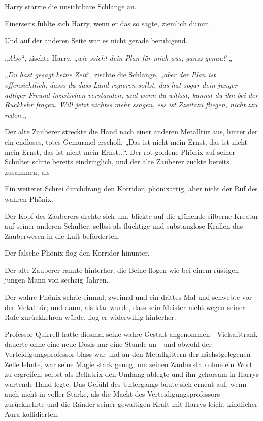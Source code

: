 {Harry starrte die unsichtbare Schlange an.

Einerseits fühlte sich Harry, wenn er das so sagte, ziemlich dumm.

Und auf der anderen Seite war es nicht gerade beruhigend.

„\emph{Also}“, zischte Harry, „\emph{wie} \emph{ssieht} \emph{dein Plan für mich aus,} \emph{ganzz} \emph{genau?} „

„\emph{Du hast gesagt keine Zeit}“, zischte die Schlange, „\emph{aber der Plan ist offensichtlich,} \emph{dasss} \emph{du} \emph{dass} \emph{Land regieren sollst, das hat sogar dein junger adliger Freund inzwischen verstanden, und wenn du} \emph{willsst, kannst du ihn bei der Rückkehr fragen. Will jetzt} \emph{nichtss} \emph{mehr} \emph{ssagen,} \emph{ess} \emph{ist} \emph{Zzeitzzu} \emph{fliegen, nicht} \emph{zzu} \emph{reden}.„

Der alte Zauberer streckte die Hand nach einer anderen Metalltür aus, hinter der ein endloses, totes Gemurmel erscholl: „Das ist nicht mein Ernst, das ist nicht mein Ernst, das ist nicht mein Ernst...“. Der rot-goldene Phönix auf seiner Schulter schrie bereits eindringlich, und der alte Zauberer zuckte bereits zusammen, als -

Ein weiterer Schrei durchdrang den Korridor, phönixartig, aber nicht der Ruf des wahren Phönix.

Der Kopf des Zauberers drehte sich um, blickte auf die glühende silberne Kreatur auf seiner anderen Schulter, selbst als flüchtige und substanzlose Krallen das Zauberwesen in die Luft beförderten.

Der falsche Phönix flog den Korridor hinunter.

Der alte Zauberer rannte hinterher, die Beine flogen wie bei einem rüstigen jungen Mann von sechzig Jahren.

Der wahre Phönix schrie einmal, zweimal und ein drittes Mal und schwebte vor der Metalltür; und dann, als klar wurde, dass sein Meister nicht wegen seiner Rufe zurückkehren würde, flog er widerwillig hinterher.

Professor Quirrell hatte diesmal seine wahre Gestalt angenommen - Vielsafttrank dauerte ohne eine neue Dosis nur eine Stunde an - und obwohl der Verteidigungsprofessor blass war und an den Metallgittern der nächstgelegenen Zelle lehnte, war seine Magie stark genug, um seinen Zauberstab ohne ein Wort zu ergreifen, selbst als Bellatrix den Umhang ablegte und ihn gehorsam in Harrys wartende Hand legte. Das Gefühl des Untergangs baute sich erneut auf, wenn auch nicht in voller Stärke, als die Macht des Verteidigungsprofessors zurückkehrte und die Ränder seiner gewaltigen Kraft mit Harrys leicht kindlicher Aura kollidierten.

}
